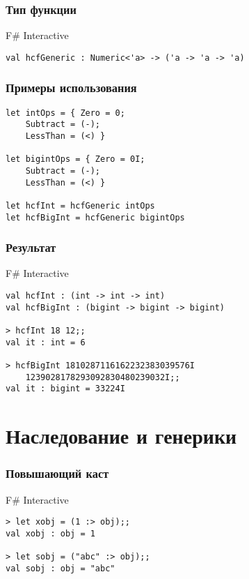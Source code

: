 \documentclass{../../slides-style}
\begin{document}
    \begin{frame}[fragile]
        \frametitle{Тип функции}
        \begin{alertblock}{F\# Interactive}
            \begin{verbatim}
val hcfGeneric : Numeric<'a> -> ('a -> 'a -> 'a)
            \end{verbatim}
        \end{alertblock}
    \end{frame}

    \begin{frame}[fragile]
        \frametitle{Примеры использования}
        \begin{verbatim}
let intOps = { Zero = 0; 
    Subtract = (-); 
    LessThan = (<) }
    
let bigintOps = { Zero = 0I; 
    Subtract = (-); 
    LessThan = (<) }

let hcfInt = hcfGeneric intOps
let hcfBigInt = hcfGeneric bigintOps
        \end{verbatim}
    \end{frame}

    \begin{frame}[fragile]
        \frametitle{Результат}
        \begin{alertblock}{F\# Interactive}
            \begin{verbatim}
val hcfInt : (int -> int -> int)
val hcfBigInt : (bigint -> bigint -> bigint)

> hcfInt 18 12;;
val it : int = 6

> hcfBigInt 1810287116162232383039576I 
    1239028178293092830480239032I;;
val it : bigint = 33224I
            \end{verbatim}
        \end{alertblock}
    \end{frame}

    \section{Наследование и генерики}
    
    \begin{frame}[fragile]
        \frametitle{Повышающий каст}
        \begin{alertblock}{F\# Interactive}
            \begin{verbatim}
> let xobj = (1 :> obj);;
val xobj : obj = 1

> let sobj = ("abc" :> obj);;
val sobj : obj = "abc"
            \end{verbatim}
        \end{alertblock}
    \end{frame}
\end{document}
